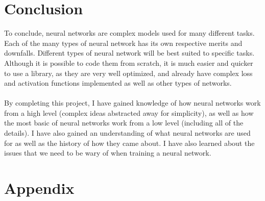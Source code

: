 \documentclass[titlepage]{article}
\begin{document}
\section{Conclusion}
To conclude, neural networks are complex models used for many different tasks. Each of the many types of neural network has its own respective merits and downfalls. Different types of neural network will be best suited to specific tasks. Although it is possible to code them from scratch, it is much easier and quicker to use a library, as they are very well optimized, and already have complex loss and activation functions implemented as well as other types of networks.
\\\\
By completing this project, I have gained knowledge of how neural networks work from a high level (complex ideas abstracted away for simplicity), as well as how the most basic of neural networks work from a low level (including all of the details). I have also gained an understanding of what neural networks are used for as well as the history of how they came about. I have also learned about the issues that we need to be wary of when training a neural network.
\newpage
\section{Appendix}
\end{document}
